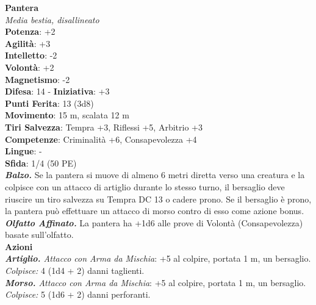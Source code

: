 \begin{multicols}{2}
\medskip\textbf{Pantera}\\
\emph{Media bestia, disallineato}\\
\textbf{Potenza}: +2\\
\textbf{Agilità}: +3\\
\textbf{Intelletto}: -2\\
\textbf{Volontà}: +2\\
\textbf{Magnetismo}: -2\\
\textbf{Difesa}: 14 - \textbf{Iniziativa}: +3\\
\textbf{Punti Ferita}: 13 (3d8)\\
\textbf{Movimento}: 15 m, scalata 12 m\\
\textbf{Tiri Salvezza}: Tempra +3, Riflessi +5, Arbitrio +3 \\
\textbf{Competenze}: Criminalità +6, Consapevolezza +4\\
\textbf{Lingue}: -\\
\textbf{Sfida}: 1/4 (50 PE)\smallskip\\
\emph{\textbf{Balzo.}} Se la pantera si muove di almeno 6 metri diretta verso una creatura e la colpisce con un attacco di artiglio durante lo stesso turno, il bersaglio deve riuscire un tiro salvezza su Tempra DC  13 o cadere prono. Se il bersaglio è prono, la pantera può effettuare un attacco di morso contro di esso come azione bonus.\\
\emph{\textbf{Olfatto Affinato.}} La pantera ha +1d6 alle prove di Volontà (Consapevolezza) basate sull'olfatto.\\
\smallskip\textbf{Azioni}\\
\emph{\textbf{Artiglio.} Attacco con Arma da Mischia}: +5 al colpire, portata 1 m, un bersaglio.\\
\emph{Colpisce:} 4 (1d4 + 2) danni taglienti.\\
\emph{\textbf{Morso.} Attacco con Arma da Mischia}: +5 al colpire, portata 1 m, un bersaglio.\\
\emph{Colpisce:} 5 (1d6 + 2) danni perforanti.\\


\end{multicols}
